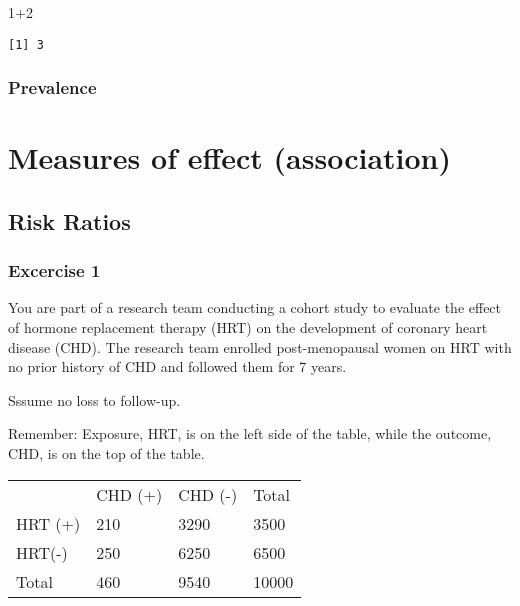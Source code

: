 \documentclass[
  14pt,
  letterpaper,
  DIV=11,
  numbers=noendperiod]{scrreprt}
\newenvironment{Shaded}{\begin{snugshade}}{\end{snugshade}}
\newcommand{\DecValTok}[1]{\textcolor[rgb]{0.68,0.00,0.00}{#1}}
\newcommand{\SpecialCharTok}[1]{\textcolor[rgb]{0.37,0.37,0.37}{#1}}
\begin{document}
\begin{Shaded}
\begin{Highlighting}[]
\DecValTok{1}\SpecialCharTok{+}\DecValTok{2}
\end{Highlighting}
\end{Shaded}

\begin{verbatim}
[1] 3
\end{verbatim}

\subsection{Prevalence}\label{prevalence}


\chapter{Measures of effect (association)}\label{sec-measure-of-effect}

\section{Risk Ratios}\label{risk-ratios}

\subsection{Excercise 1}\label{excercise-1}

You are part of a research team conducting a cohort study to evaluate
the effect of hormone replacement therapy (HRT) on the development of
coronary heart disease (CHD). The research team enrolled post-menopausal
women on HRT with no prior history of CHD and followed them for 7 years.

Sssume no loss to follow-up.

Remember: Exposure, HRT, is on the left side of the table, while the
outcome, CHD, is on the top of the table.

\begin{longtable}[]{@{}llll@{}}
\toprule\noalign{}
\endhead
\bottomrule\noalign{}
\endlastfoot
& CHD (+) & CHD (-) & Total \\
HRT (+) & 210 & 3290 & 3500 \\
HRT(-) & 250 & 6250 & 6500 \\
Total & 460 & 9540 & 10000 \\
\end{longtable}
\end{document}

